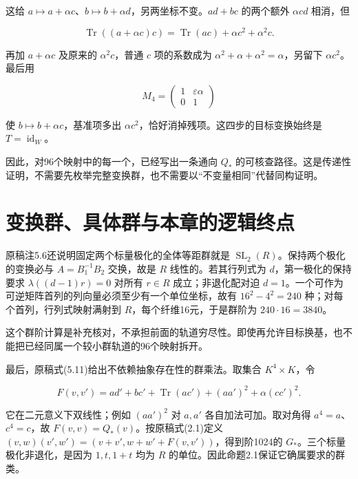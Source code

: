 \documentclass[UTF8,fontset=fandol,zihao=-4,openany,oneside]{ctexbook}
\begin{document}
这给 \(a\mapsto a+\alpha c\)、\(b\mapsto b+\alpha d\)，另两坐标不变。\(ad+bc\) 的两个额外 \(\alpha cd\) 相消，但



\[
\operatorname{Tr}((a+\alpha c)c)
=\operatorname{Tr}(ac)+\alpha c^2+\alpha^2c.
\]



再加 \(a+\alpha c\) 及原来的 \(\alpha^2c\)，普通 \(c\) 项的系数成为 \(\alpha^2+\alpha+\alpha^2=\alpha\)，另留下 \(\alpha c^2\)。最后用



\[
M_4=\begin{pmatrix}1&\varepsilon\alpha\\0&1\end{pmatrix}
\]



使 \(b\mapsto b+\alpha c\)，基准项多出 \(\alpha c^2\)，恰好消掉残项。这四步的目标变换始终是 \(T=\operatorname{id}_W\)。



因此，对96个映射中的每一个，已经写出一条通向 \(Q_*\) 的可核查路径。这是传递性证明，不需要先枚举完整变换群，也不需要以“不变量相同”代替同构证明。



\section{变换群、具体群与本章的逻辑终点}


原稿注5.6还说明固定两个标量极化的全体等距群就是 \(\operatorname{SL}_2(R)\)。保持两个极化的变换必与 \(A=B_1^{-1}B_2\) 交换，故是 \(R\) 线性的。若其行列式为 \(d\)，第一极化的保持要求 \(\lambda((d-1)r)=0\) 对所有 \(r\in R\) 成立；非退化配对迫 \(d=1\)。一个可作为可逆矩阵首列的列向量必须至少有一个单位坐标，故有 \(16^2-4^2=240\) 种；对每个首列，行列式映射满射到 \(R\)，每个纤维16元，于是群阶为 \(240\cdot16=3840\)。



这个群阶计算是补充核对，不承担前面的轨道穷尽性。即使再允许目标换基，也不能把已经同属一个较小群轨道的96个映射拆开。



最后，原稿式(5.11)给出不依赖抽象存在性的群乘法。取集合 \(K^4\times K\)，令



\[
F(v,v')=ad'+bc'+\operatorname{Tr}(ac')+(aa')^2+\alpha(cc')^2.
\]



它在二元意义下双线性；例如 \((aa')^2\) 对 \(a,a'\) 各自加法可加。取对角得 \(a^4=a\)、\(c^4=c\)，故 \(F(v,v)=Q_*(v)\)。按原稿式(2.1)定义 \((v,w)(v',w')=(v+v',w+w'+F(v,v'))\)，得到阶1024的 \(G_*\)。三个标量极化非退化，是因为 \(1,t,1+t\) 均为 \(R\) 的单位。因此命题2.1保证它确属要求的群类。
\end{document}

